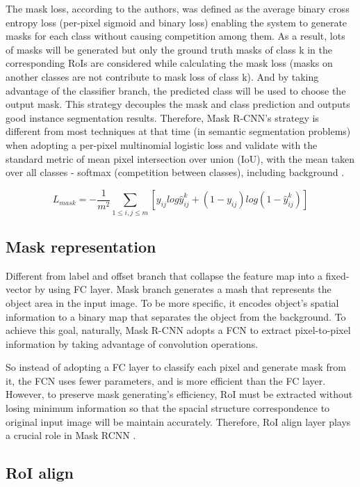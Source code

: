 	The mask loss, according to the authors, was defined as the average binary cross entropy loss (per-pixel sigmoid and binary loss) enabling the system to generate masks for each class without causing competition among them. As a result, lots of masks will be generated but only the ground truth masks of class k in the corresponding RoIs are considered while calculating the mask loss (masks on another classes are not contribute to mask loss of class k). And by taking advantage of the classifier branch, the predicted class will be used to choose the output mask. This strategy decouples the mask and class prediction and outputs good instance segmentation results. Therefore, Mask R-CNN’s strategy is different from most techniques at that time (in semantic segmentation problems) when adopting a per-pixel multinomial logistic loss and validate with the standard metric of mean pixel intersection over union (IoU), with the mean taken over all classes - softmax (competition between classes), including background \cite{maskrcnn}.
	
	\[ L_{mask} = -\frac{1}{m^2} \sum_{1 \leqslant i, j \leqslant m} [ y_{ij}log\hat{y}^k_{ij} + (1-y_{ij})log(1-\hat{y}^k_{ij}) ] \]
	
\subsection{Mask representation}
\label{subsection:mask_representation}
\noindent
	
	Different from label and offset branch that collapse the feature map into a fixed-vector by using FC layer. Mask branch generates a mash that represents the object area in the input image. To be more specific, it encodes object's spatial information to a binary map that separates the object from the background. To achieve this goal, naturally, Mask R-CNN adopts a FCN to extract pixel-to-pixel information by taking advantage of convolution operations.
	
	So instead of adopting a FC layer to classify each pixel and generate mask from it, the FCN uses fewer parameters, and is more efficient than the FC layer. However, to preserve mask generating's efficiency, RoI must be extracted without losing minimum information so that the spacial structure correspondence to original input image will be maintain accurately. Therefore, RoI align layer plays a crucial role in Mask RCNN \cite{maskrcnn}.
	
\subsection{RoI align}
\label{subsection:roialign}
\noindent
	
